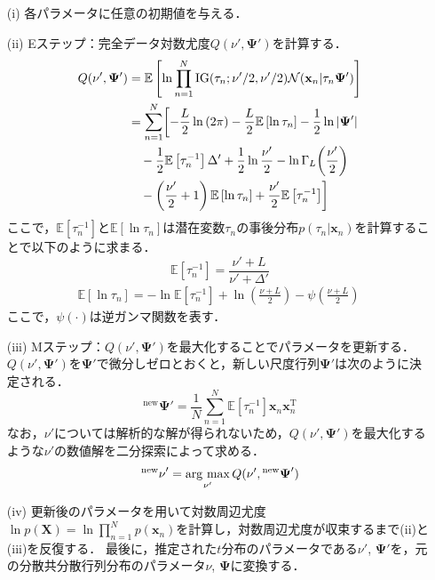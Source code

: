 \documentclass[journal]{IEEEtran}
\newcommand{\argmax}{\mathop{\rm arg\ max}\limits}
\begin{document}
\begin{enumerate}
\setlength{\parskip}{0cm} %
\setlength{\itemsep}{0cm} %
\item[(i)] 各パラメータに任意の初期値を与える．
\item[(ii)] Eステップ：完全データ対数尤度$Q(\nu',\bm \Psi')$を計算する．
\begin{align}%
  Q(\nu',\bm{\Psi}')&=\mathbb{E} \left[\ln{\prod_{n=1}^{N}\mathrm{IG}(\tau_n;\nu'/2,\nu'/2) \mathcal{N}(\mathbf{x}_n|\tau_n \bm{\Psi}')}\right]  \notag  \\
  &=\sum_{n=1}^{N} \biggl[-\frac{L}{2}\ln{(2\pi)}-\frac{L}{2}\mathbb{E}\left[\ln{\tau_n}\right]-\frac{1}{2}\ln{|\bm \Psi'|} \notag \\
  &\quad-\frac{1}{2}\mathbb{E}\left[\tau^{-1}_n\right]\Delta'+\frac{1}{2} \ln{\frac{\nu'}{2}} - \ln{\Gamma_L{\left(\frac{\nu'}{2}\right)}} \notag \\
  &\quad- \left(\frac{\nu'}{2}+1\right)\mathbb{E}\left[\ln{\tau_n}\right]+\frac{\nu'}{2}\mathbb{E}\left[\tau^{-1}_n \right] \biggr]
\end{align}
ここで，$\mathbb{E}\left[\tau^{-1}_n\right]$と$\mathbb{E}\left[\ln{\tau_n}\right]$は潜在変数$\tau_n$の事後分布$p(\tau_n|\mathbf{x}_n)$を計算することで以下のように求まる．
\begin{equation}%
\mathbb{E}\left[\tau^{-1}_n\right]=\frac{\nu'+L}{\nu'+\Delta'}
\end{equation}
\begin{eqnarray}%
&\mathbb{E}\left[\ln{\tau_n}\right]=-\ln{\mathbb{E}\left[\tau^{-1}_n\right]}+\ln{\left(\frac{\nu+L}{2}\right)}-{\psi}\left(\frac{\nu+L}{2}\right)\quad
\end{eqnarray}
ここで，$\psi(\cdot)$は逆ガンマ関数を表す．
\item[(iii)] Mステップ：$Q(\nu', \bm \Psi')$を最大化することでパラメータを更新する．$Q(\nu', \bm \Psi')$を$\bm \Psi'$で微分しゼロとおくと，新しい尺度行列$\bm \Psi'$は次のように決定される．
\begin{equation}%
{^\mathrm{new} {\bm \Psi}}' = \frac{1}{N} \sum_{n=1}^{N} \mathbb{E}\left[\tau^{-1}_n\right] \mathbf{x}_n \mathbf{x}_n^\mathrm{T}
\end{equation}
なお，$\nu'$については解析的な解が得られないため，$Q(\nu', \bm \Psi')$を最大化するような$\nu'$の数値解を二分探索によって求める．
\begin{equation}%
{^\mathrm{new} \nu}' = \argmax_{\nu'}  Q(\nu', {^\mathrm{new} {\bm \Psi}}')
\end{equation}
\item[(iv)] 更新後のパラメータを用いて対数周辺尤度$\ln{p(\mathbf{X})} = \ln{\prod_{n=1}^N p(\mathbf{x}_n)}$を計算し，対数周辺尤度が収束するまで(ii)と(iii)を反復する．
最後に，推定された$t$分布のパラメータである$\nu'$, $\bm \Psi'$を，元の分散共分散行列分布のパラメータ$\nu$, $\bm \Psi$に変換する．
\end{enumerate}
\end{document}
